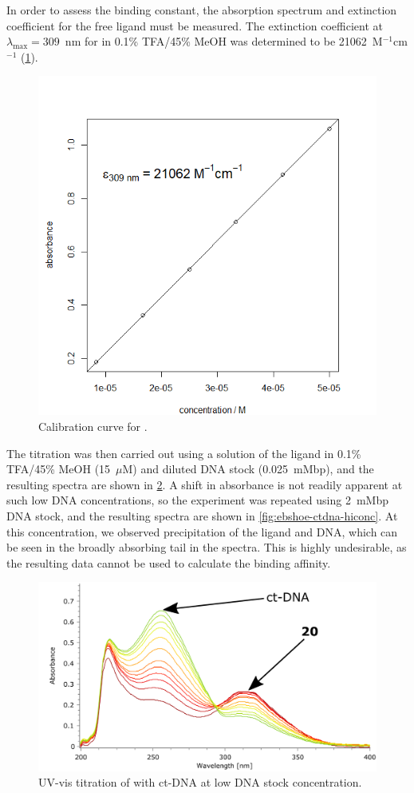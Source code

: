 \begin{refsection}
In order to assess the binding constant, the absorption spectrum and extinction coefficient for the free ligand must be measured.
The extinction coefficient at $\lambda_{\text{max}} = 309$~nm for  in 0.1\% TFA/45\% MeOH was determined to be 21062~M$^{-1}$cm$^{-1}$ (\cref{fig:ebs-rhs-ph-calcurve}).

\begin{figure}
    \includegraphics[width=0.5\linewidth]{Figures/ebshoe-calibration.png}
    \caption{Calibration curve for .}\label{fig:ebs-rhs-ph-calcurve}
\end{figure}

The titration was then carried out using a solution of the ligand in 0.1\% TFA/45\% MeOH (15~$\mu$M) and diluted DNA stock (0.025~mMbp), and the resulting spectra are shown in \cref{fig:ebshoe-ctdna-lowconc}.
A shift in absorbance is not readily apparent at such low DNA concentrations, so the experiment was repeated using 2~mMbp DNA stock, and the resulting spectra are shown in \cref{fig:ebshoe-ctdna-hiconc}.
At this concentration, we observed precipitation of the ligand and DNA, which can be seen in the broadly absorbing tail in the spectra.
This is highly undesirable, as the resulting data cannot be used to calculate the binding affinity.

\begin{figure}
    \includegraphics[width=0.7\linewidth]{Figures/ebshoe-ctdna-lowconc.pdf}
    \caption{UV-vis titration of  with ct-DNA at low DNA stock concentration.}\label{fig:ebshoe-ctdna-lowconc}
\end{figure}


\end{refsection}
